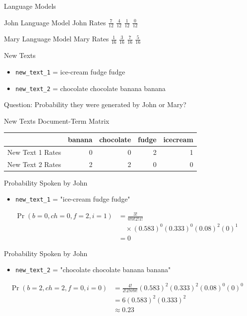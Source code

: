 \documentclass[11pt,aspectratio=43]{beamer}
\newcommand{\term}[1]{\texttt{#1}}
\begin{document}
\begin{frame}{Language Models}
\begin{block}{John Language Model}
John Rates \qquad $\frac{7}{12}$ \qquad $\frac{4}{12}$ \qquad $\frac{1}{12}$ \qquad $\frac{0}{12}$
\end{block}
\vspace{1em}
\begin{exampleblock}{Mary Language Model}
Mary Rates \qquad $\frac{1}{16}$ \qquad $\frac{3}{16}$ \qquad $\frac{7}{16}$ \qquad $\frac{5}{16}$
\end{exampleblock}
\end{frame}

\begin{frame}{New Texts}
\begin{itemize}
\item \term{new\_text\_1} = ice-cream fudge fudge
\item \term{new\_text\_2} = chocolate chocolate banana banana
\end{itemize}
\vspace{1em}
Question: Probability they were generated by John or Mary?
\end{frame}

\begin{frame}{New Texts Document-Term Matrix}
\centering
\small
\begin{tabular}{l|rrrr}
 & banana & chocolate & fudge & icecream\\ \hline
New Text 1 Rates&0&0&2&1\\
New Text 2 Rates&2&2&0&0
\end{tabular}
\end{frame}

\begin{frame}{Probability Spoken by John}
\begin{itemize}
\item \term{new\_text\_1} = "ice-cream fudge fudge"
\end{itemize}
\[
\begin{aligned}
\Pr(b=0,ch=0,f=2,i=1)
&=\frac{3!}{0!0!2!1!}\\
&\quad\times(0.583)^0(0.333)^0(0.08)^2(0)^1\\
&=0
\end{aligned}
\]
\end{frame}

\begin{frame}{Probability Spoken by John}
\begin{itemize}
\item \term{new\_text\_2} = "chocolate chocolate banana banana"
\end{itemize}
\[
\begin{aligned}
\Pr(b=2,ch=2,f=0,i=0)
&=\frac{4!}{2!2!0!0!}
(0.583)^2(0.333)^2(0.08)^0(0)^0\\
&=6(0.583)^2(0.333)^2\\
&\approx0.23
\end{aligned}
\]
\end{frame}
\end{document}
